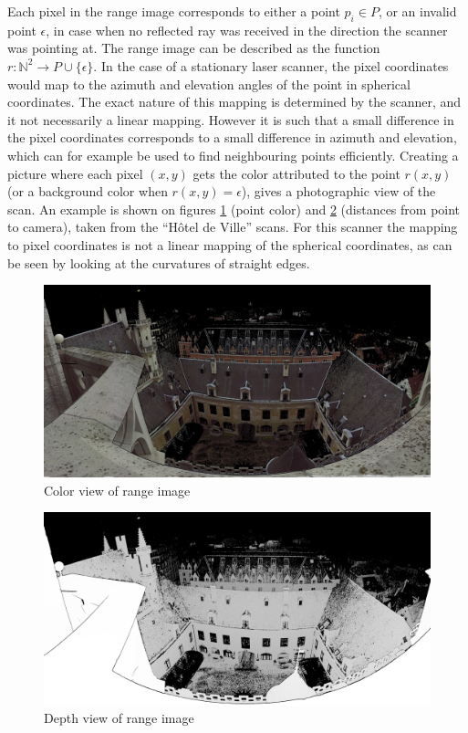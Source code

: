 Each pixel in the range image corresponds to either a point $p_i \in P$, or an invalid point $\epsilon$, in case when no reflected ray was received in the direction the scanner was pointing at. The range image can be described as the function $r : \mathbb{N}^2 \rightarrow P \cup \{ \epsilon \}$. In the case of a stationary laser scanner, the pixel coordinates would map to the azimuth and elevation angles of the point in spherical coordinates. The exact nature of this mapping is determined by the scanner, and it not necessarily a linear mapping. However it is such that a small difference in the pixel coordinates corresponds to a small difference in azimuth and elevation, which can for example be used to find neighbouring points efficiently. Creating a picture where each pixel $(x, y)$ gets the color attributed to the point $r(x, y)$ (or a background color when $r(x, y) = \epsilon$), gives a photographic view of the scan. An example is shown on figures \ref{fig:hdv_033_color} (point color) and \ref{fig:hdv_033_range} (distances from point to camera), taken from the ``Hôtel de Ville'' scans. For this scanner the mapping to pixel coordinates is not a linear mapping of the spherical coordinates, as can be seen by looking at the curvatures of straight edges.

\begin{figure}[p]
\center
\includegraphics[width=.8\textwidth]{fig/hdv_033_color.jpg}
\caption{Color view of range image}
\label{fig:hdv_033_color}
\end{figure}

\begin{figure}[p]
\center
\includegraphics[width=.8\textwidth]{fig/hdv_033_range.jpg}
\caption{Depth view of range image}
\label{fig:hdv_033_range}
\end{figure}

